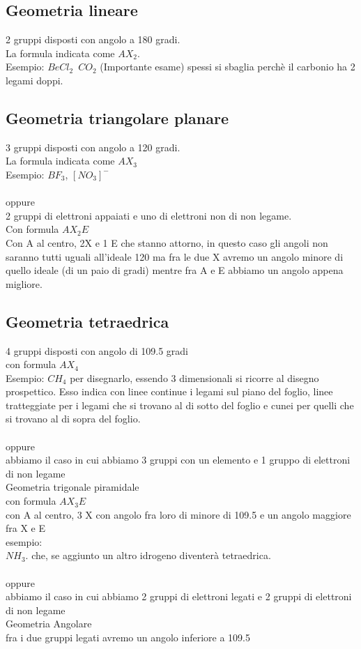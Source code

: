 \subsection{Geometria lineare}
2 gruppi disposti con angolo a 180 gradi.\\
La formula indicata come $AX_2$.\\
Esempio: $BeCl_2$\
$CO_2$ (Importante esame) spessi si sbaglia perchè il carbonio ha 2 legami doppi.
\subsection{Geometria triangolare planare}
3 gruppi disposti con angolo a 120 gradi.\\
La formula indicata come $AX_3$\\
Esempio: $BF_3$, $\left[NO_3\right]^-$\\\\
oppure\\
2 gruppi di elettroni appaiati e uno di elettroni non di non legame.\\
Con formula $AX_2E$\\
Con A al centro, 2X e 1 E che stanno attorno, in questo caso gli angoli non saranno tutti uguali all'ideale 120 ma fra le due X avremo un angolo minore di quello ideale (di un paio di gradi) mentre fra A e E abbiamo un angolo appena migliore.\
\subsection{Geometria tetraedrica}
4 gruppi disposti con angolo di 109.5 gradi\\
con formula $AX_4$\\
Esempio: $CH_4$ per disegnarlo, essendo 3 dimensionali si ricorre al disegno prospettico. Esso indica con linee continue i legami sul piano del foglio, linee tratteggiate per i legami che si trovano al di sotto del foglio e cunei per quelli che si trovano al di sopra del foglio.\\\\
oppure \\
abbiamo il caso in cui abbiamo 3 gruppi con un elemento e 1 gruppo di elettroni di non legame\\
Geometria trigonale piramidale\\
con formula $AX_3E$\\
con A al centro, 3 X con angolo fra loro di minore di 109.5 e un angolo maggiore fra X e E\\
esempio: \\
$NH_3$. che, se aggiunto un altro idrogeno diventerà tetraedrica.\\\\
oppure\\
abbiamo il caso in cui abbiamo 2 gruppi di elettroni legati e 2 gruppi di elettroni di non legame\\
Geometria Angolare\\
fra i due gruppi legati avremo un angolo inferiore a 109.5
